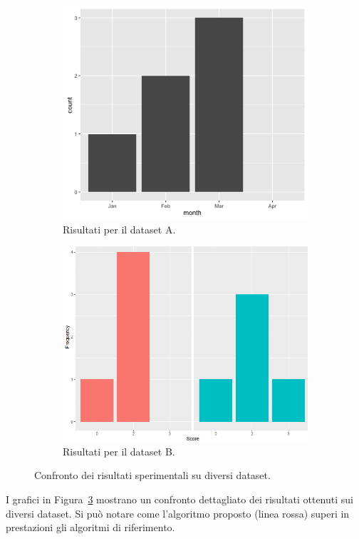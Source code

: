 \begin{figure}[htbp]
    \centering
    \begin{subfigure}{0.45\textwidth}
        \centering
        \includegraphics[width=\textwidth]{immagini/placeholder-graph-1.png}
        \caption{Risultati per il dataset A.}
        \label{fig:risultati-a}
    \end{subfigure}
    \hfill
    \begin{subfigure}{0.45\textwidth}
        \centering
        \includegraphics[width=\textwidth]{immagini/placeholder-graph-2.png}
        \caption{Risultati per il dataset B.}
        \label{fig:risultati-b}
    \end{subfigure}
    \caption{Confronto dei risultati sperimentali su diversi dataset.}
    \label{fig:risultati-completi}
\end{figure}

I grafici in Figura~\ref{fig:risultati-completi} mostrano un confronto dettagliato dei risultati ottenuti sui diversi dataset. Si può notare come l'algoritmo proposto (linea rossa) superi in prestazioni gli algoritmi di riferimento.